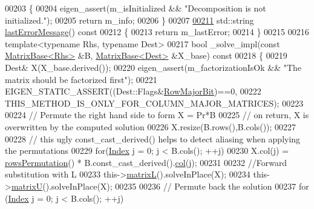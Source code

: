 \begin{DoxyCode}
00203 \textcolor{keyword}{    }\{
00204       eigen\_assert(m\_isInitialized && \textcolor{stringliteral}{"Decomposition is not initialized."});
00205       \textcolor{keywordflow}{return} m\_info;
00206     \}
00207     
\hyperlink{group___sparse_l_u___module_a5458c4e851d7d75c8ca92c4fd02d2adb}{00211}     std::string \hyperlink{group___sparse_l_u___module_a5458c4e851d7d75c8ca92c4fd02d2adb}{lastErrorMessage}()\textcolor{keyword}{ const}
00212 \textcolor{keyword}{    }\{
00213       \textcolor{keywordflow}{return} m\_lastError; 
00214     \}
00215 
00216     \textcolor{keyword}{template}<\textcolor{keyword}{typename} Rhs, \textcolor{keyword}{typename} Dest>
00217     \textcolor{keywordtype}{bool} \_solve\_impl(\textcolor{keyword}{const} \hyperlink{group___core___module_class_eigen_1_1_matrix_base}{MatrixBase<Rhs>} &B, \hyperlink{group___core___module_class_eigen_1_1_matrix_base}{MatrixBase<Dest>} &X\_base)\textcolor{keyword}{
       const}
00218 \textcolor{keyword}{    }\{
00219       Dest& X(X\_base.derived());
00220       eigen\_assert(m\_factorizationIsOk && \textcolor{stringliteral}{"The matrix should be factorized first"});
00221       EIGEN\_STATIC\_ASSERT((Dest::Flags&\hyperlink{group__flags_gae4f56c2a60bbe4bd2e44c5b19cbe8762}{RowMajorBit})==0,
00222                         THIS\_METHOD\_IS\_ONLY\_FOR\_COLUMN\_MAJOR\_MATRICES);
00223       
00224       \textcolor{comment}{// Permute the right hand side to form X = Pr*B}
00225       \textcolor{comment}{// on return, X is overwritten by the computed solution}
00226       X.resize(B.rows(),B.cols());
00227 
00228       \textcolor{comment}{// this ugly const\_cast\_derived() helps to detect aliasing when applying the permutations}
00229       \textcolor{keywordflow}{for}(\hyperlink{namespace_eigen_a62e77e0933482dafde8fe197d9a2cfde}{Index} j = 0; j < B.cols(); ++j)
00230         X.col(j) = \hyperlink{group___sparse_l_u___module_a691295e65c06df599876d78ac2c7fada}{rowsPermutation}() * B.const\_cast\_derived().\hyperlink{group___core___module_a469583ed90462820888344e63ebe1a80}{col}(j);
00231       
00232       \textcolor{comment}{//Forward substitution with L}
00233       this->\hyperlink{group___sparse_l_u___module_a634abe55e5a076f2e10db78871105a8f}{matrixL}().solveInPlace(X);
00234       this->\hyperlink{group___sparse_l_u___module_aaf395a8fca527144215ff19cc7b8b637}{matrixU}().solveInPlace(X);
00235       
00236       \textcolor{comment}{// Permute back the solution }
00237       \textcolor{keywordflow}{for} (\hyperlink{namespace_eigen_a62e77e0933482dafde8fe197d9a2cfde}{Index} j = 0; j < B.cols(); ++j)

\end{DoxyCode}
